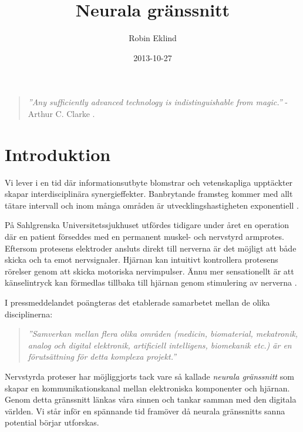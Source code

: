 \documentclass[12pt, a4paper]{article}
\title{Neurala gränssnitt}
\author{Robin Eklind}
\date{2013-10-27}
\begin{document}
\maketitle

\vfill

\begin{quote}
	\textit{''Any sufficiently advanced technology is indistinguishable from
	magic.''} - \\ Arthur C. Clarke \cite{clarke_quote}.
\end{quote}

\pagebreak

\tableofcontents

\pagebreak


\section{Introduktion}

Vi lever i en tid där informationsutbyte blomstrar och vetenskapliga upptäckter
skapar interdisciplinära synergieffekter. Banbrytande framsteg kommer med allt
tätare intervall och inom många områden är utvecklingshastigheten exponentiell
\cite{exponential}.

På Sahlgrenska Universitetssjukhuset utfördes tidigare under året en operation
där en patient förseddes med en permanent muskel- och nervstyrd armprotes.
Eftersom protesens elektroder ansluts direkt till nerverna är det möjligt att
både skicka och ta emot nervsignaler. Hjärnan kan intuitivt kontrollera
protesens rörelser genom att skicka motoriska nervimpulser. Ännu mer
sensationellt är att känselintryck kan förmedlas tillbaka till hjärnan genom
stimulering av nerverna \cite{prosthetic_operation}.

I pressmeddelandet poängteras det etablerade samarbetet mellan de olika
disciplinerna:
\begin{quote}
	\textit{''Samverkan mellan flera olika områden (medicin, biomaterial,
	mekatronik, analog och digital elektronik, artificiell intelligens,
	biomekanik etc.) är en förutsättning för detta komplexa projekt.''}
	\cite{prosthetic_operation}
\end{quote}

Nervstyrda proteser har möjliggjorts tack vare så kallade \textit{neurala
gränssnitt} som skapar en kommunikationskanal mellan elektroniska komponenter
och hjärnan. Genom detta gränssnitt länkas våra sinnen och tankar samman med den
digitala världen. Vi står inför en spännande tid framöver då neurala gränssnitts
sanna potential börjar utforskas.
\end{document}
